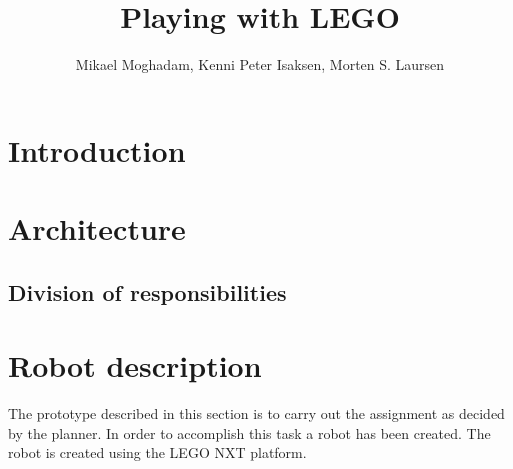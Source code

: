 \documentclass[draft, english, a4paper]{article}
\title{Playing with LEGO}
\author{Mikael Moghadam, Kenni Peter Isaksen, Morten S. Laursen}
\begin{document}
\maketitle %


%
%
\section{Introduction}
\newpage
\tableofcontents
\newpage
\section{Architecture}
	\subsection{Division of responsibilities}
\section{Robot description}
        The prototype described in this section is to carry out the assignment as
        decided by the planner. In order to accomplish this task a robot 
        has been created. The robot is created using the LEGO NXT platform.  
\end{document}

